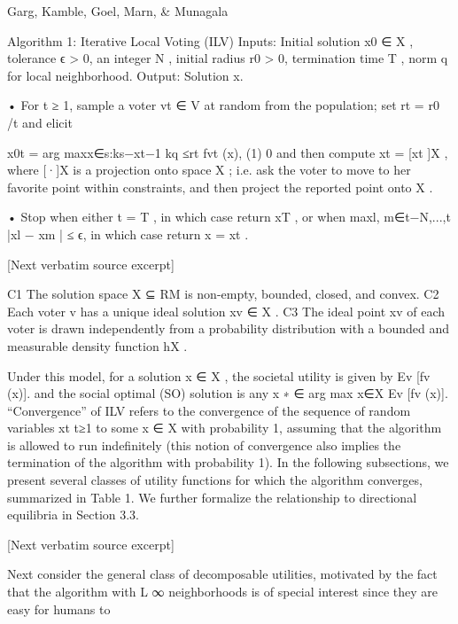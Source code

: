 \documentclass[10pt]{article}
\begin{document}
\begin{ReviewVerbatim}
                          Garg, Kamble, Goel, Marn, & Munagala


 Algorithm 1: Iterative Local Voting (ILV)
  Inputs: Initial solution x0 ∈ X , tolerance ϵ > 0, an integer N , initial radius r0 > 0,
    termination time T , norm q for local neighborhood.
   Output:     Solution x.

       • For t ≥ 1, sample a voter vt ∈ V at random from the population; set rt = r0 /t
           and elicit


                             x0t = arg maxx∈{s:ks−xt−1 kq ≤rt } fvt (x),             (1)
                                         0
           and then compute xt = [xt ]X , where [·]X is a projection onto space X ; i.e. ask
           the voter to move to her favorite point within constraints, and then project the
           reported point onto X .


       • Stop when either t = T , in which case return xT , or when
         maxl, m∈{t−N,...,t} |xl − xm | ≤ ϵ, in which case return x = xt .

[Next verbatim source excerpt]

 C1 The solution space X ⊆ RM is non-empty, bounded, closed, and convex.
 C2 Each voter v has a unique ideal solution xv ∈ X .
 C3 The ideal point xv of each voter is drawn independently from a probability distribution
      with a bounded and measurable density function hX .


Under this model, for a solution x ∈ X , the societal utility is given by Ev [fv (x)]. and the
social optimal (SO) solution is any x
                                         ∗ ∈ arg max
                                                    x∈X Ev [fv (x)].
   “Convergence” of    ILV refers to the convergence of the sequence of random variables
{xt }t≥1 to some x ∈ X with probability 1, assuming that the algorithm is allowed to run
indefinitely (this notion of convergence also implies the termination of the algorithm with
probability 1).
   In the following subsections, we present several classes of utility functions for which
the algorithm converges, summarized in Table 1. We further formalize the relationship to
directional equilibria in Section 3.3.

[Next verbatim source excerpt]

Next consider the general class of decomposable utilities, motivated by the fact that the
algorithm with L
                  ∞ neighborhoods is of special interest since they are easy for humans to


\end{ReviewVerbatim}
\end{document}
